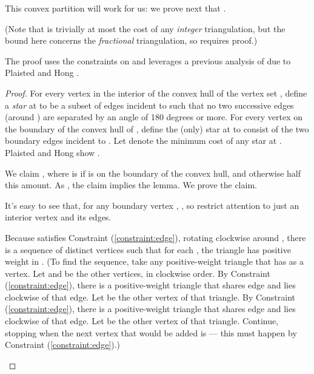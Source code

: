 \documentclass[final]{siamltex}
\begin{document}
This convex partition will work for us:
we prove next that .

(Note that  is trivially at most the cost of any {\em integer}
triangulation, but the bound here concerns the {\em fractional} triangulation,
so requires proof.)

The proof uses the constraints on  and leverages
a previous analysis of 
due to Plaisted and Hong \cite[Lemma 10]{plaisted1987heuristic}.
\begin{lemma}\label{lemma:fracmcp}
 
\end{lemma}

\begin{proof}
  For every vertex  in the interior of the convex hull of the vertex set , 
  define a {\em star} at  to be a subset of edges incident to 
  such that no two successive edges (around ) 
  are separated by an angle of 180 degrees or more.
  For every vertex  on the boundary of the convex hull of , 
  define the (only) star at  to consist
  of the two boundary edges  incident to .
Let  denote the minimum cost of any star at .
  Plaisted and Hong show 
  \cite[Lemma 10]{plaisted1987heuristic}.

  We claim , where  is  if  is on the boundary of the convex hull, 
  and otherwise half this amount.
  As ,
  the claim implies the lemma.
  We prove the claim.

  It's easy to see that, for any boundary vertex , , 
  so restrict attention to just an interior vertex  and its edges.

  \newcommand{\wrap}{\text{wrap}}

\begin{window}
    Because  satisfies Constraint (\ref{constraint:edge}),
    rotating clockwise around , 
    there is a sequence 
    of distinct vertices
    such that for each ,
    the triangle 
    has positive weight in .
    (To find the sequence, take any positive-weight triangle that has  as a vertex.
    Let  and  be the other vertices, in clockwise order.
    By Constraint (\ref{constraint:edge}), there is a positive-weight triangle 
    that shares edge  and lies clockwise of that edge.
    Let  be the other vertex of that triangle.
    By Constraint (\ref{constraint:edge}), there is a positive-weight triangle 
    that shares edge  and lies clockwise of that edge.
    Let   be the other vertex of that triangle.
    Continue, stopping when the next vertex 
    that would be added is  ---
    this must happen by Constraint (\ref{constraint:edge}).)
  \end{window}
  

\end{proof}
\end{document}
